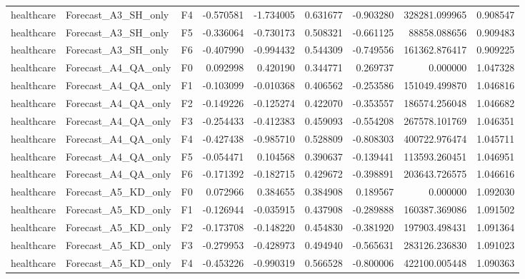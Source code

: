 \begin{tabular}{lllrrrrrr}
healthcare &          Forecast\_A3\_SH\_only &  F4 & -0.570581 & -1.734005 & 0.631677 & -0.903280 &    328281.099965 &             0.908547 \\
healthcare &          Forecast\_A3\_SH\_only &  F5 & -0.336064 & -0.730173 & 0.508321 & -0.661125 &     88858.088656 &             0.909483 \\
healthcare &          Forecast\_A3\_SH\_only &  F6 & -0.407990 & -0.994432 & 0.544309 & -0.749556 &    161362.876417 &             0.909225 \\
healthcare &          Forecast\_A4\_QA\_only &  F0 &  0.092998 &  0.420190 & 0.344771 &  0.269737 &         0.000000 &             1.047328 \\
healthcare &          Forecast\_A4\_QA\_only &  F1 & -0.103099 & -0.010368 & 0.406562 & -0.253586 &    151049.499870 &             1.046816 \\
healthcare &          Forecast\_A4\_QA\_only &  F2 & -0.149226 & -0.125274 & 0.422070 & -0.353557 &    186574.256048 &             1.046682 \\
healthcare &          Forecast\_A4\_QA\_only &  F3 & -0.254433 & -0.412383 & 0.459093 & -0.554208 &    267578.101769 &             1.046351 \\
healthcare &          Forecast\_A4\_QA\_only &  F4 & -0.427438 & -0.985710 & 0.528809 & -0.808303 &    400722.976474 &             1.045711 \\
healthcare &          Forecast\_A4\_QA\_only &  F5 & -0.054471 &  0.104568 & 0.390637 & -0.139441 &    113593.260451 &             1.046951 \\
healthcare &          Forecast\_A4\_QA\_only &  F6 & -0.171392 & -0.182715 & 0.429672 & -0.398891 &    203643.726575 &             1.046616 \\
healthcare &          Forecast\_A5\_KD\_only &  F0 &  0.072966 &  0.384655 & 0.384908 &  0.189567 &         0.000000 &             1.092030 \\
healthcare &          Forecast\_A5\_KD\_only &  F1 & -0.126944 & -0.035915 & 0.437908 & -0.289888 &    160387.369086 &             1.091502 \\
healthcare &          Forecast\_A5\_KD\_only &  F2 & -0.173708 & -0.148220 & 0.454830 & -0.381920 &    197903.498431 &             1.091364 \\
healthcare &          Forecast\_A5\_KD\_only &  F3 & -0.279953 & -0.428973 & 0.494940 & -0.565631 &    283126.236830 &             1.091023 \\
healthcare &          Forecast\_A5\_KD\_only &  F4 & -0.453226 & -0.990319 & 0.566528 & -0.800006 &    422100.005448 &             1.090363 \\

\end{tabular}
